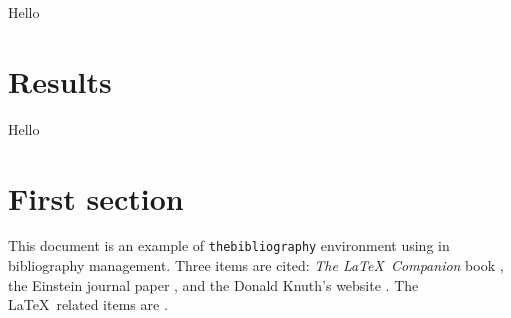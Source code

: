 Hello

\section{Results}

Hello

\section{First section}

This document is an example of \texttt{thebibliography} environment using 
in bibliography management. Three items are cited: \textit{The \LaTeX\ Companion} 
book \cite{latexcompanion}, the Einstein journal paper \cite{einstein}, and the 
Donald Knuth's website \cite{knuthwebsite}. The \LaTeX\ related items are
\cite{latexcompanion,knuthwebsite}.